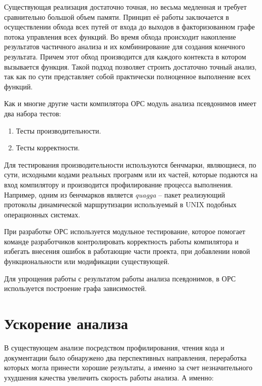 Существующая реализация достаточно точная, но весьма медленная и требует сравнительно большой объем памяти. Принцип её работы заключается в осуществлении обхода всех путей от входа до выходов в факторизованном графе потока управления всех функций. Во время обхода происходит накопление результатов частичного анализа и их комбинирование для создания конечного результата. Причем этот обход производится для каждого контекста в котором вызывается функция. Такой подход позволяет строить достаточно точный анализ, так как по сути представляет собой практически полноценное выполнение всех функций.

Как и многие другие части компилятора ОРС модуль анализа псевдонимов имеет два набора тестов:
\begin{enumerate}
    \item Тесты производительности.
    \item Тесты корректности.
\end{enumerate}

Для тестирования производительности используются бенчмарки, являющиеся, по сути, исходными кодами реальных программ или их частей, которые подаются на вход компилятору и производится профилирование процесса выполнения. Например, одним из бенчмарков является \textit{quagga} -- пакет реализующий протоколы динамической маршрутизации используемый в UNIX подобных операционных системах.

При разработке ОРС используется модульное тестирование, которое помогает команде разработчиков контролировать корректность работы компилятора и избегать внесения ошибок в работающие части проекта, при добавлении новой функциональности или модификации существующей.

Для упрощения работы с результатом работы анализа псевдонимов, в ОРС используется построение графа зависимостей.

\section{Ускорение анализа}

В существующем анализе посредством профилирования, чтения кода и документации было обнаружено два перспективных направления, переработка которых могла принести хорошие результаты, а именно за счет незначительного ухудшения качества увеличить скорость работы анализа. А именно:

